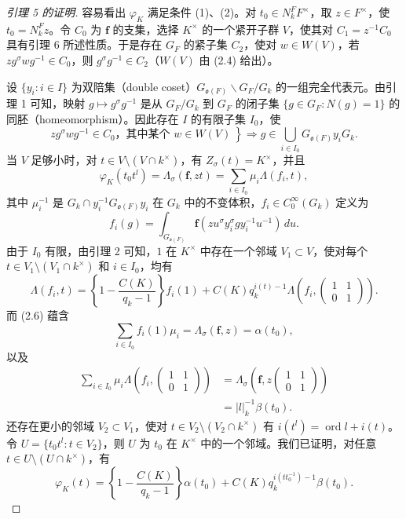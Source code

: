 \begin{proof}[引理 5 的证明]
容易看出 $\varphi_K$ 满足条件 (1)、(2)。对 $t_0\in N_k^FF^\times$，取 $z\in F^\times$，使 $t_0=N_k^Fz$。令 $C_0$ 为 $\boldsymbol f$ 的支集，选择 $K^\times$ 的一个紧开子群 $V$，使其对 $C_1=z^{-1}C_0$ 具有引理 6 所述性质。于是存在 $G_F$ 的紧子集 $C_2$，使对 $w\in W(V)$，若 $zg^\sigma wg^{-1}\in C_0$，则 $g^\sigma g^{-1}\in C_2$（$W(V)$ 由 (2.4) 给出）。

设 $\{y_i:i\in I\}$ 为双陪集（double coset）$G_{\mathfrak o(F)}\backslash G_F/G_k$ 的一组完全代表元。由引理 1 可知，映射 $g\mapsto g^\sigma g^{-1}$ 是从 $G_F/G_k$ 到 $G_F$ 的闭子集 $\{g\in G_F:N(g)=1\}$ 的同胚（homeomorphism）。因此存在 $I$ 的有限子集 $I_0$，使
\begin{equation}
 \left.
 zg^\sigma wg^{-1}\in C_0\text{，其中某个 }w\in W(V)
 \ \right\}\Longrightarrow
 g\in\bigcup_{i\in I_0}G_{\mathfrak o(F)}y_iG_k.
 \tag{2.6}
\end{equation}
当 $V$ 足够小时，对 $t\in V\setminus(V\cap k^\times)$，有 $Z_\sigma(t)=K^\times$，并且
\[
 \varphi_K(t_0t^l)=\Lambda_\sigma(\boldsymbol f,zt)
 =\sum_{i\in I_0}\mu_i\Lambda(f_i,t),
\]
其中 $\mu_i^{-1}$ 是 $G_k\cap y_i^{-1}G_{\mathfrak o(F)}y_i$ 在 $G_k$ 中的不变体积，$f_i\in C_0^\infty(G_k)$ 定义为
\[
 f_i(g)=\int_{G_{\mathfrak o(F)}}
 \boldsymbol f(zu^\sigma y_i^\sigma gy_i^{-1}u^{-1})\,du.
\]
由于 $I_0$ 有限，由引理 2 可知，$1$ 在 $K^\times$ 中存在一个邻域 $V_1\subset V$，使对每个 $t\in V_1\setminus(V_1\cap k^\times)$ 和 $i\in I_0$，均有
\[
 \Lambda(f_i,t)=\left\{1-\frac{C(K)}{q_k-1}\right\}f_i(1)
 +C(K)q_k^{i(t)-1}\Lambda\left(f_i,\begin{pmatrix}1&1\\0&1\end{pmatrix}\right).
\]
而 (2.6) 蕴含
\[
 \sum_{i\in I_0}f_i(1)\mu_i=\Lambda_\sigma(\boldsymbol f,z)=\alpha(t_0),
\]
以及
\[
 \begin{aligned}
 \sum_{i\in I_0}\mu_i\Lambda\left(f_i,\begin{pmatrix}1&1\\0&1\end{pmatrix}\right)
 &=\Lambda_\sigma\left(\boldsymbol f,z\begin{pmatrix}1&1\\0&1\end{pmatrix}\right)\\
 &=|l|_k^{-1}\beta(t_0).
 \end{aligned}
\]
还存在更小的邻域 $V_2\subset V_1$，使对 $t\in V_2\setminus(V_2\cap k^\times)$ 有 $i(t^l)=\operatorname{ord}l+i(t)$。令 $U=\{t_0t^l:t\in V_2\}$，则 $U$ 为 $t_0$ 在 $K^\times$ 中的一个邻域。我们已证明，对任意 $t\in U\setminus(U\cap k^\times)$，有
\begin{equation}
 \varphi_K(t)=\left\{1-\frac{C(K)}{q_k-1}\right\}\alpha(t_0)
 +C(K)q_k^{i(tt_0^{-1})-1}\beta(t_0).
 \tag{2.7}
\end{equation}


\end{proof}
